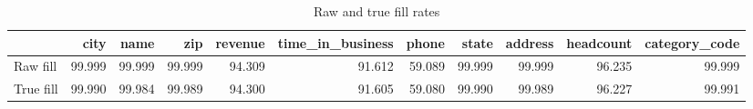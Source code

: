 \documentclass[12pt]{article}\usepackage[]{graphicx}\usepackage[]{color}
\begin{document}
\begin{table}[htb]
\begin{center}
{\tiny

\begin{tabular}{l|r|r|r|r|r|r|r|r|r|r}
\hline
  & city & name & zip & revenue & time\_in\_business & phone & state & address & headcount & category\_code\\
\hline
Raw fill & 99.999 & 99.999 & 99.999 & 94.309 & 91.612 & 59.089 & 99.999 & 99.999 & 96.235 & 99.999\\
\hline
True fill & 99.990 & 99.984 & 99.989 & 94.300 & 91.605 & 59.080 & 99.990 & 99.989 & 96.227 & 99.991\\
\hline
\end{tabular}

}
\end{center}
\label{tbl:allfill}
\caption{\small Raw and true fill rates}
\end{table}
\end{document}
